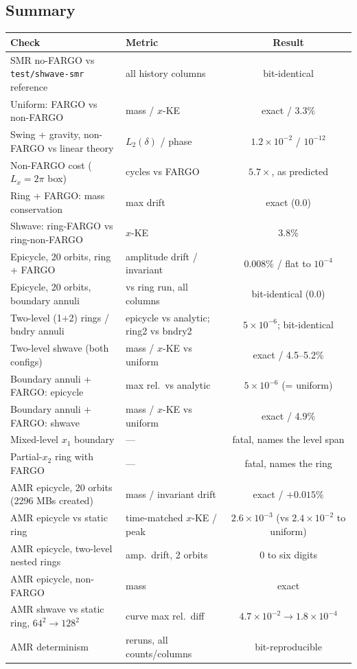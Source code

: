 \documentclass[11pt]{article}
\newcommand{\code}[1]{\texttt{#1}}
\begin{document}
\subsection{Summary}
\begin{center}
\small
\begin{tabular}{@{}llc@{}}
\toprule
Check & Metric & Result \\
\midrule
SMR no-FARGO vs \code{test/shwave-smr} reference & all history columns & bit-identical \\
Uniform: FARGO vs non-FARGO & mass / $x$-KE & exact / 3.3\% \\
Swing + gravity, non-FARGO vs linear theory & $L_2(\delta)$ / phase & $1.2\times10^{-2}$ / $10^{-12}$ \\
Non-FARGO cost ($L_x{=}2\pi$ box) & cycles vs FARGO & $5.7\times$, as predicted \\
Ring + FARGO: mass conservation & max drift & exact (0.0) \\
Shwave: ring-FARGO vs ring-non-FARGO & $x$-KE & 3.8\% \\
Epicycle, 20 orbits, ring + FARGO & amplitude drift / invariant & $0.008\%$ / flat to $10^{-4}$ \\
Epicycle, 20 orbits, boundary annuli & vs ring run, all columns & bit-identical (0.0) \\
Two-level (1$+$2) rings / bndry annuli & epicycle vs analytic; ring2 vs bndry2 &
  $5\times10^{-6}$; bit-identical \\
Two-level shwave (both configs) & mass / $x$-KE vs uniform & exact / 4.5--5.2\% \\
Boundary annuli + FARGO: epicycle & max rel.\ vs analytic & $5\times10^{-6}$ (= uniform) \\
Boundary annuli + FARGO: shwave & mass / $x$-KE vs uniform & exact / 4.9\% \\
Mixed-level $x_1$ boundary & --- & fatal, names the level span \\
Partial-$x_2$ ring with FARGO & --- & fatal, names the ring \\
\midrule
AMR epicycle, 20 orbits (2296 MBs created) & mass / invariant drift & exact / $+0.015\%$ \\
AMR epicycle vs static ring & time-matched $x$-KE / peak & $2.6\times10^{-3}$ (vs $2.4\times10^{-2}$ to uniform) \\
AMR epicycle, two-level nested rings & amp.\ drift, 2 orbits & $0$ to six digits \\
AMR epicycle, non-FARGO & mass & exact \\
AMR shwave vs static ring, $64^2 \to 128^2$ & curve max rel.\ diff & $4.7\times10^{-2} \to 1.8\times10^{-4}$ \\
AMR determinism & reruns, all counts/columns & bit-reproducible \\
\bottomrule
\end{tabular}
\end{center}
\end{document}
